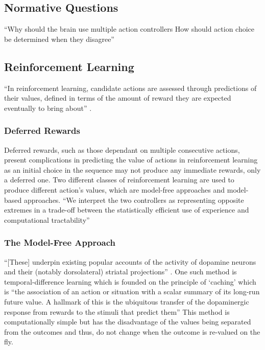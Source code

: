 \documentclass[10pt]{article}
\begin{document}
\subsection{Normative Questions}

	``Why should the brain use multiple action controllers
	How should action choice be determined when they disagree'' \parencite{Daw}


\subsection{Reinforcement Learning}

	``In reinforcement learning, candidate actions are assessed through predictions of their values, defined in terms of the amount of reward they are expected eventually to bring about'' \parencite{Daw}.

	\subsubsection{Deferred Rewards}

		Deferred rewards, such as those dependant on multiple consecutive actions, present complications in predicting the value of actions in reinforcement learning as an initial choice in the sequence may not produce any immediate rewards, only a deferred one. Two different classes of reinforcement learning are used to produce different action's values, which are model-free approaches and model-based approaches. ``We interpret the two controllers as representing opposite extremes in a trade-off between the statistically efficient use of experience and computational tractability'' \parencite{Daw}

	\subsubsection{The Model-Free Approach}

		``[These] underpin existing popular accounts of the activity of dopamine neurons and their (notably dorsolateral) striatal projections'' \parencite{Daw}. One such method is temporal-difference learning which is founded on the principle of `caching' which is ``the association of an action or situation with a scalar summary of its long-run future value.
		A hallmark of this is the ubiquitous transfer of the dopaminergic response from rewards to the stimuli that predict them'' \parencite{Daw} This method is computationally simple but has the disadvantage of the values being separated from the outcomes and thus, do not change when the outcome is re-valued on the fly.
\end{document}
